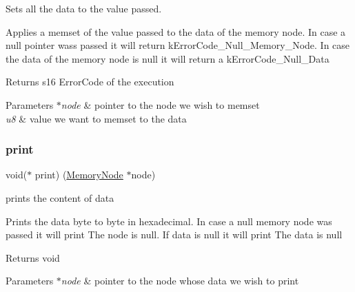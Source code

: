 Sets all the data to the value passed. 

Applies a memset of the value passed to the data of the memory node. In case a null pointer wass passed it will return k\+Error\+Code\+\_\+\+Null\+\_\+\+Memory\+\_\+\+Node. In case the data of the memory node is null it will return a k\+Error\+Code\+\_\+\+Null\+\_\+\+Data

\begin{DoxyReturn}{Returns}
s16 Error\+Code of the execution 
\end{DoxyReturn}

\begin{DoxyParams}{Parameters}
{\em $\ast$node} & pointer to the node we wish to memset \\
\hline
{\em u8} & value we want to memset to the data \\
\hline
\end{DoxyParams}
\mbox{\label{structmemory__node__ops__s_a785bfc1434d849c6b0dd77bc3cd4195e}} 
\subsubsection{\texorpdfstring{print}{print}}
{\footnotesize\ttfamily void($\ast$ print) (\hyperlink{structmemory__node__s}{Memory\+Node} $\ast$node)}



prints the content of data 

Prints the data byte to byte in hexadecimal. In case a null memory node was passed it will print The node is null. If data is null it will print The data is null \begin{DoxyReturn}{Returns}
void 
\end{DoxyReturn}

\begin{DoxyParams}{Parameters}
{\em $\ast$node} & pointer to the node whose data we wish to print \\
\hline
\end{DoxyParams}
\mbox{\label{structmemory__node__ops__s_a50b5474576ccd1add08efa49a64d65a4}} 
